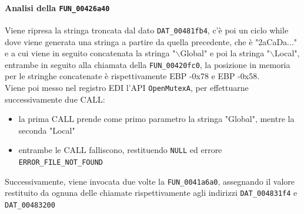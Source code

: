 \documentclass[12pt]{extarticle}
\begin{document}
\paragraph{Analisi della \texttt{FUN\_00426a40}}
Viene ripresa la stringa troncata dal dato \texttt{DAT\_00481fb4}, c'è poi un ciclo while dove viene generata una stringa a partire da quella precedente, che è "2aCaDa..." e a cui viene in seguito concatenata la stringa "$\backslash$Global" e poi la stringa "$\backslash$Local", entrambe in seguito alla chiamata della \texttt{FUN\_00420fc0}, la posizione in memoria per le stringhe concatenate è rispettivamente EBP -0x78 e EBP -0x58.\\Viene poi messo nel registro EDI l'API \texttt{OpenMutexA}, per effettuarne successivamente due CALL:
\begin{itemize}
    \item la prima CALL prende come primo parametro la stringa "Global", mentre la seconda "Local"
    \item entrambe le CALL falliscono, restituendo \texttt{NULL} ed errore \texttt{ERROR\_FILE\_NOT\_FOUND}
\end{itemize}
Successivamente, viene invocata due volte la \texttt{FUN\_0041a6a0}, assegnando il valore restituito da ognuna delle chiamate rispettivamente agli indirizzi \texttt{DAT\_004831f4} e \texttt{DAT\_00483200}
\end{document}
